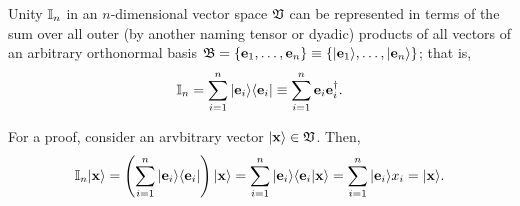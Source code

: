 Unity ${\Bbb I}_n$ in an $n$-dimensional vector space ${\frak V}$ can be represented in terms of the sum
over all outer (by another naming tensor or dyadic) products of all vectors of an arbitrary orthonormal basis
${\frak B} =\{
{\bf e}_1,
\ldots ,
{\bf e}_n
\}
\equiv
\{
\vert {\bf e}_1 \rangle ,
\ldots ,
\vert{\bf e}_n \rangle
\}
$; that is,
\begin{equation}
 {\Bbb I}_n = \sum_{i=1}^n \vert {\bf e}_i \rangle \langle {\bf e}_i \vert
\equiv  \sum_{i=1}^n {\bf e}_i  {\bf e}_i^\dagger  .
\end{equation}

{\color{OliveGreen}
\bproof

For a proof, consider an arvbitrary vector $\vert {\bf x} \rangle  \in {\frak V}$.
Then,
\begin{equation}
 {\Bbb I}_n \vert {\bf x} \rangle
 =
\left(\sum_{i=1}^n \vert {\bf e}_i \rangle \langle {\bf e}_i \vert \right)
\vert {\bf x} \rangle
=
\sum_{i=1}^n \vert {\bf e}_i \rangle \langle {\bf e}_i \vert {\bf x} \rangle
=
\sum_{i=1}^n \vert {\bf e}_i \rangle  x_i
=  \vert {\bf x} \rangle
.
\end{equation}
\eproof
}



